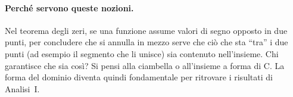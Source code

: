 \paragraph{Perché servono queste nozioni.} Nel teorema degli zeri, se una funzione assume valori di segno opposto in due punti, per concludere che si annulla in mezzo serve che ciò che sta ``tra'' i due punti (ad esempio il segmento che li unisce) sia contenuto nell'insieme. Chi garantisce che sia così? Si pensi alla ciambella o all'insieme a forma di C. La forma del dominio diventa quindi fondamentale per ritrovare i risultati di Analisi~I.

